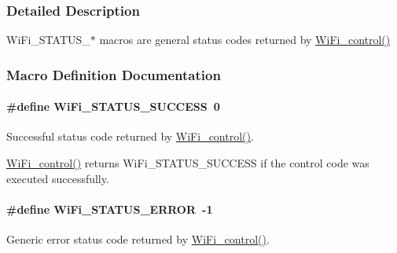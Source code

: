 \subsubsection{Detailed Description}
Wi\+Fi\+\_\+\+S\+T\+A\+T\+U\+S\+\_\+$\ast$ macros are general status codes returned by \hyperlink{_wi_fi_8h_a1f42a1e174ed1682b7de43ec6f043bf7}{Wi\+Fi\+\_\+control()} 

\subsubsection{Macro Definition Documentation}
\paragraph[{Wi\+Fi\+\_\+\+S\+T\+A\+T\+U\+S\+\_\+\+S\+U\+C\+C\+E\+S\+S}]{\setlength{\rightskip}{0pt plus 5cm}\#define Wi\+Fi\+\_\+\+S\+T\+A\+T\+U\+S\+\_\+\+S\+U\+C\+C\+E\+S\+S~0}\label{group___wi_fi___s_t_a_t_u_s_ga02c176082ea8f3c0a258564269dffe71}


Successful status code returned by \hyperlink{_wi_fi_8h_a1f42a1e174ed1682b7de43ec6f043bf7}{Wi\+Fi\+\_\+control()}. 

\hyperlink{_wi_fi_8h_a1f42a1e174ed1682b7de43ec6f043bf7}{Wi\+Fi\+\_\+control()} returns Wi\+Fi\+\_\+\+S\+T\+A\+T\+U\+S\+\_\+\+S\+U\+C\+C\+E\+S\+S if the control code was executed successfully. 
\paragraph[{Wi\+Fi\+\_\+\+S\+T\+A\+T\+U\+S\+\_\+\+E\+R\+R\+O\+R}]{\setlength{\rightskip}{0pt plus 5cm}\#define Wi\+Fi\+\_\+\+S\+T\+A\+T\+U\+S\+\_\+\+E\+R\+R\+O\+R~-\/1}\label{group___wi_fi___s_t_a_t_u_s_ga3ad6de679b76f24a0fb86eb3299253ad}


Generic error status code returned by \hyperlink{_wi_fi_8h_a1f42a1e174ed1682b7de43ec6f043bf7}{Wi\+Fi\+\_\+control()}. 


